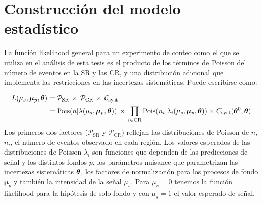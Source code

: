 \section{Construcción del modelo estadístico}




La función likelihood general para un experimento de conteo como el que se utiliza
en el análisis de esta tesis es el producto de los términos de Poisson del
número de eventos en la SR y las CR, y una distribución adicional que implementa
las restricciones en las incertezas sistemáticas. Puede escribirse como:

\begin{align}
  L(\mu_s, \bm{\mu}_p, \bm{\theta}) &= \mathcal{P}_\text{SR} \, \times \, \mathcal{P}_\text{CR} \, \times \,
  \mathcal{C}_\text{syst} \nonumber \\
  &= \operatorname{Pois}(n|\lambda(\mu_s, \bm{\mu}_p, \bm{\theta})) \, \times \, \prod_{i \in \text{CR}}
  \operatorname{Pois}(n_i|\lambda_i(\mu_s, \bm{\mu}_p, \bm{\theta})) \times C_\text{syst} (\bm{\theta}^0, \bm{\theta}) \label{eq:model}
\end{align}
%
Los primeros dos factores ($\mathcal{P}_\text{SR}$ y $\mathcal{P}_\text{CR}$)
reflejan las distribuciones de Poisson de $n$, $n_i$, el número de eventos observado
en cada región. Los valores esperados de las distribuciones de Poisson $\lambda_i$ son
funciones que dependen de las predicciones de señal y los distintos fondos $p$,
los parámetros nuisance que parametrizan las incertezas sistemáticas $\bm{\theta}$,
los factores de normalización para los procesos de fondo $\bm{\mu}_p$ y también
la intensidad de la señal $\mu_s$. Para $\mu_s = 0$ tenemos la
función likelihood para la hipótesis de solo-fondo y con $\mu_s = 1$ el
valor esperado de señal. %

